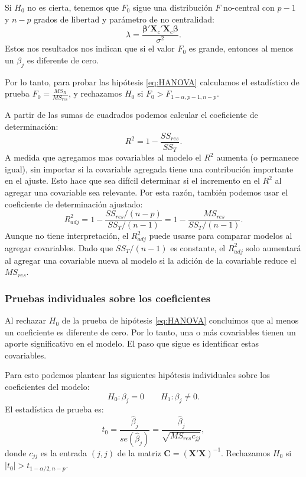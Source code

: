 \documentclass[
]{article}
\begin{document}
Si \(H_{0}\) no es cierta, tenemos que \(F_{0}\) sigue una distribución \(F\) no-central con \(p-1\) y \(n-p\) grados de libertad y parámetro de no centralidad:
\[
\lambda = \frac{\boldsymbol \beta'\boldsymbol X_{c}'\boldsymbol X_{c}\boldsymbol \beta}{\sigma^{2}}.
\]
Estos nos resultados nos indican que si el valor \(F_{0}\) es grande, entonces al menos un \(\beta_{j}\) es diferente de cero.

Por lo tanto, para probar las hipótesis \eqref{eq:HANOVA} calculamos el estadístico de prueba \(F_{0} = \frac{MS_{R}}{MS_{res}}\), y rechazamos \(H_{0}\) si \(F_{0} > F_{1-\alpha,p-1,n-p}\).

A partir de las sumas de cuadrados podemos calcular el coeficiente de determinación:
\[
R^{2} = 1-\frac{SS_{res}}{SS_{T}}.
\]
A medida que agregamos mas covariables al modelo el \(R^{2}\) aumenta (o permanece igual), sin importar si la covariable agregada tiene una contribución importante en el ajuste. Esto hace que sea difícil determinar si el incremento en el \(R^{2}\) al agregar una covariable sea relevante. Por esta razón, también podemos usar el coeficiente de determinación ajustado:
\[
R^{2}_{adj} = 1-\frac{SS_{res}/(n-p)}{SS_{T}/(n-1)} = 1 - \frac{MS_{res}}{SS_T/(n-1)}.
\]
Aunque no tiene interpretación, el \(R^{2}_{adj}\) puede usarse para comparar modelos al agregar covariables. Dado que \(SS_{T}/(n-1)\) es constante, el \(R^{2}_{adj}\) solo aumentará al agregar una covariable nueva al modelo si la adición de la covariable reduce el \(MS_{res}\).

\hypertarget{pruebas-individuales-sobre-los-coeficientes}{%
\subsubsection{Pruebas individuales sobre los coeficientes}\label{pruebas-individuales-sobre-los-coeficientes}}

Al rechazar \(H_{0}\) de la prueba de hipótesis \eqref{eq:HANOVA} concluimos que al menos un coeficiente es diferente de cero. Por lo tanto, una o más covariables tienen un aporte significativo en el modelo. El paso que sigue es identificar estas covariables.

Para esto podemos plantear las siguientes hipótesis individuales sobre los coeficientes del modelo:
\[
H_{0}: \beta_{j} = 0 \qquad H_{1}: \beta_{j} \neq 0.
\]
El estadística de prueba es:
\[
t_{0} = \frac{\widehat{\beta}_{j}}{se(\widehat{\beta}_{j})} = \frac{\widehat{\beta}_{j}}{\sqrt{MS_{res}c_{jj}}},
\]
donde \(c_{jj}\) es la entrada \((j,j)\) de la matriz \(\boldsymbol C= (\boldsymbol X'\boldsymbol X)^{-1}\). Rechazamos \(H_{0}\) si \(|t_{0}| > t_{1-\alpha/2,n-p}\).
\end{document}

